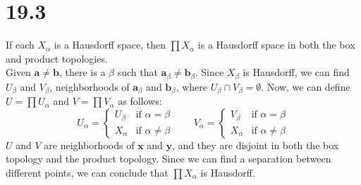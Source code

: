 \documentclass{article}
\begin{document}
\section*{19.3}
If each $X_\alpha$ is a Hausdorff space, then $\prod X_\alpha$ is a Hausdorff space in both the box and product topologies.
\\
Given $\bm{a} \neq \bm{b}$, there is a $\beta$ such that $\bm{a}_\beta \neq \bm{b}_\beta$. Since $X_\beta$ is Hausdorff, we can find $U_\beta$ and $V_\beta$, neighborhoods of $\bm{a}_\beta$ and $\bm{b}_\beta$, where $U_\beta \cap V_\beta = \emptyset$. Now, we can define $U = \prod{U_\alpha}$ and $V = \prod{V_\alpha}$ as follows:
\begin{equation*}
    U_\alpha = \begin{cases}
        U_\beta  & \text{if } \alpha = \beta \\
        X_\alpha & \text{if } \alpha \neq \beta
    \end{cases}
    \qquad
    V_\alpha = \begin{cases}
        V_\beta  & \text{if } \alpha = \beta \\
        X_\alpha & \text{if } \alpha \neq \beta
    \end{cases}
\end{equation*}
$U$ and $V$ are neighborhoods of $\bm{x}$ and $\bm{y}$, and they are disjoint in both the box topology and the product topology. Since we can find a separation between different points, we can conclude that $\prod X_\alpha$ is Hausdorff.
\end{document}
